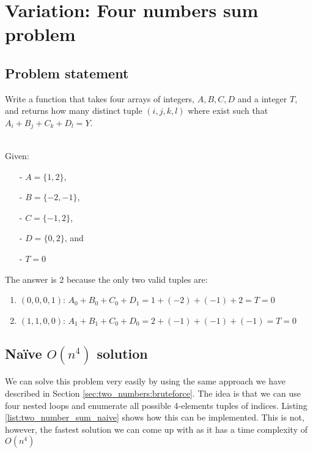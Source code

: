 \section*{Variation: Four numbers sum problem}
\label{sec:four_number}

\subsection{Problem statement}

\begin{exercise}
Write a function that takes four arrays of integers, $A,B,C,D$ and a integer $T$,
and returns how many distinct tuple $(i,j,k,l)$ where exist such that $A_i+B_j+C_k+D_l = Y$.

\begin{example}
\hfill \\
Given:
	\begin{itemize}
		\item[-] 	$A=\{1,2\}$,
		\item[-] 	$B=\{-2,-1\}$,
		\item[-] 	$C=\{-1,2\}$,
		\item[-]	$D=\{0,2\}$, and 
		\item[-] 	$T = 0$
	\end{itemize}
The answer is $2$ because the only two valid tuples are:
\begin{enumerate}
	\item $(0,0,0,1)$: $A_0 + B_0 + C_0 + D_1 = 1 + (-2) + (-1) + 2 = T = 0$
	\item $(1,1,0,0)$: $A_1 + B_1 + C_0 + D_0 = 2 + (-1) + (-1) + (-1) = T = 0$
\end{enumerate}
\end{example}
\end{exercise}

\subsection{Na\"ive $O(n^4)$ solution}
We can solve this problem very easily by using the same approach we have described in Section \ref{sec:two_numbers:bruteforce}.
The idea is that we can use four nested loops and enumerate all possible 4-elements tuples of indices. Listing \ref{list:two_number_sum_naive} shows how this can be implemented.
This is not, however,  the fastest solution we can come up with as it has a time complexity of $O(n^4)$



